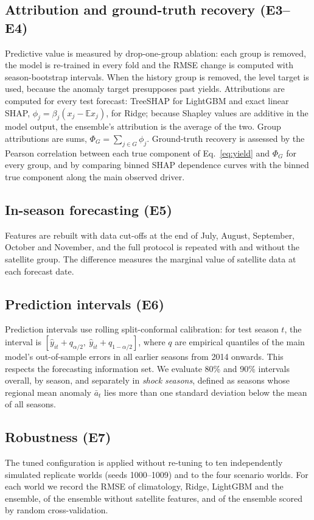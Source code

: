 \subsection{Attribution and ground-truth recovery (E3--E4)}
Predictive value is measured by drop-one-group ablation: each group is removed, the model is re-trained in every fold and the RMSE change is computed with season-bootstrap intervals. When the history group is removed, the level target is used, because the anomaly target presupposes past yields. Attributions are computed for every test forecast: TreeSHAP for LightGBM \citep{lundberg2020local} and exact linear SHAP, $\phi_j=\beta_j(x_j-\mathbb E x_j)$, for Ridge; because Shapley values are additive in the model output, the ensemble's attribution is the average of the two. Group attributions are sums, $\Phi_G=\sum_{j\in G}\phi_j$. Ground-truth recovery is assessed by the Pearson correlation between each true component of Eq.~\eqref{eq:yield} and $\Phi_G$ for every group, and by comparing binned SHAP dependence curves with the binned true component along the main observed driver.

\subsection{In-season forecasting (E5)}
Features are rebuilt with data cut-offs at the end of July, August, September, October and November, and the full protocol is repeated with and without the satellite group. The difference measures the marginal value of satellite data at each forecast date.

\subsection{Prediction intervals (E6)}
Prediction intervals use rolling split-conformal calibration: for test season $t$, the interval is $[\hat y_{it}+q_{\alpha/2},\ \hat y_{it}+q_{1-\alpha/2}]$, where $q$ are empirical quantiles of the main model's out-of-sample errors in all earlier seasons from 2014 onwards. This respects the forecasting information set. We evaluate 80\% and 90\% intervals overall, by season, and separately in \emph{shock seasons}, defined as seasons whose regional mean anomaly $\bar a_t$ lies more than one standard deviation below the mean of all seasons.

\subsection{Robustness (E7)}\label{sec:robustness}
The tuned configuration is applied without re-tuning to ten independently simulated replicate worlds (seeds 1000--1009) and to the four scenario worlds. For each world we record the RMSE of climatology, Ridge, LightGBM and the ensemble, of the ensemble without satellite features, and of the ensemble scored by random cross-validation.

